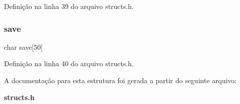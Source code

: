Definição na linha 39 do arquivo structs.\+h.

\mbox{\label{structespec__s_a179914f2ebe7b9f5348b0800c2876a65}} 
\subsubsection{save}
{\footnotesize\ttfamily char save[50]}



Definição na linha 40 do arquivo structs.\+h.



A documentação para esta estrutura foi gerada a partir do seguinte arquivo\+:\begin{DoxyCompactItemize}
\item 
\textbf{ structs.\+h}\end{DoxyCompactItemize}
